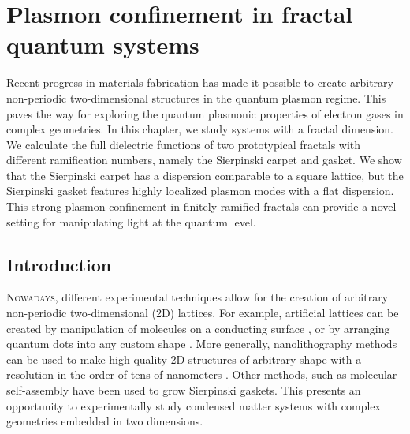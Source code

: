 \cleartoverso
\thispagestyle{empty}%
\BgThisPage
\clearpage
\chapter{Plasmon confinement in fractal quantum systems}\label{ch:prb18}
\BgThisPage

{\small Recent progress in materials fabrication has made it possible to create arbitrary non-periodic two-dimensional structures in the quantum plasmon regime. This paves the way for exploring the quantum plasmonic properties of electron gases in complex geometries. In this chapter, we study systems with a fractal dimension.  We calculate the full dielectric functions of two prototypical fractals with different ramification numbers, namely the Sierpinski carpet and gasket. We show that the Sierpinski carpet has a dispersion comparable to a square lattice, but the Sierpinski gasket features highly localized plasmon modes with a flat dispersion. This strong plasmon confinement in finitely ramified fractals can provide a novel setting for manipulating light at the quantum level.}

\clearpage

\section{Introduction}

\lettrine[lines=3]{N}{owadays}, different experimental techniques allow for the creation of arbitrary non-periodic two-dimensional (2D) lattices. For example, artificial lattices can be created by manipulation of molecules on a conducting surface \cite{gomes2012designer, slot2017experimental}, or by arranging quantum dots into any custom shape \cite{engineering2009, artificial2013}.  More generally, nanolithography methods can be used to make high-quality 2D structures of arbitrary shape with a resolution in the order of tens of nanometers \cite{scarabelli2015fabrication}. Other methods, such as molecular self-assembly \cite{newkome2006nanoassembly, assembly2015} have been used to grow Sierpinski gaskets. This presents an opportunity to experimentally study condensed matter systems with complex geometries embedded in two dimensions.

